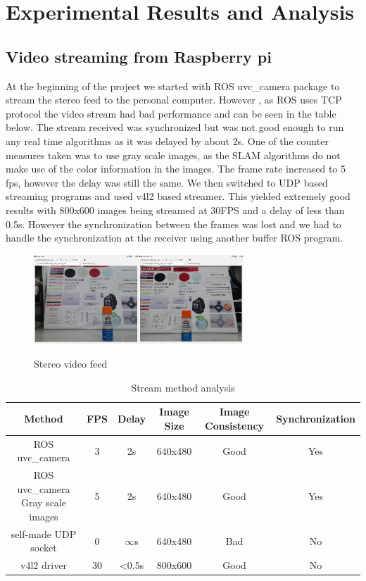 \documentclass[10pt]{article}
\begin{document}
\section{Experimental Results and Analysis}
\subsection{Video streaming from Raspberry pi}
	At the beginning of the project we started with ROS uvc\_camera package to stream the stereo feed to the personal computer. However , as ROS uses TCP protocol the video stream had bad performance and can be seen in the table below. The stream received was synchronized but was not good enough to run any real time algorithms as it was delayed by about 2s. One of the counter measures taken was to use gray scale images, as the SLAM algorithms do not make use of the color information in the images. The frame rate increased to 5 fps, however the delay was still the same. We then switched to UDP based streaming programs and used v4l2 based streamer. This yielded extremely good results with 800x600 images being streamed at 30FPS and a delay of less than 0.5s. However the synchronization between the frames was lost and we had to handle the synchronization at the receiver using another buffer ROS program.
\begin{figure}[H]
\centering \includegraphics[width=0.7\textwidth]{stereo_view.png}\label{Stereo video feed}
\caption{Stereo video feed}
\end{figure}
\begin{table}[H]
\begin{center}
\begin{tabular}{|c|c|c|c|c|c|}
\hline
Method &FPS & Delay & Image Size & Image Consistency & Synchronization\\[1ex]
\hline
ROS uvc\_camera & 3 & 2s & 640x480 & Good & Yes\\ [1ex]
\hline 
ROS uvc\_camera Gray scale images& 5 & 2s & 640x480 & Good & Yes\\ [1ex]
\hline 
self-made UDP socket& 0 & $\infty$s & 640x480 & Bad & No\\ [1ex]
\hline 
v4l2 driver & 30 & \textless 0.5s  & 800x600 & Good & No\\ [1ex]
\hline

\end{tabular}
\caption{Stream method analysis}
\end{center}
\end{table}
\end{document}
